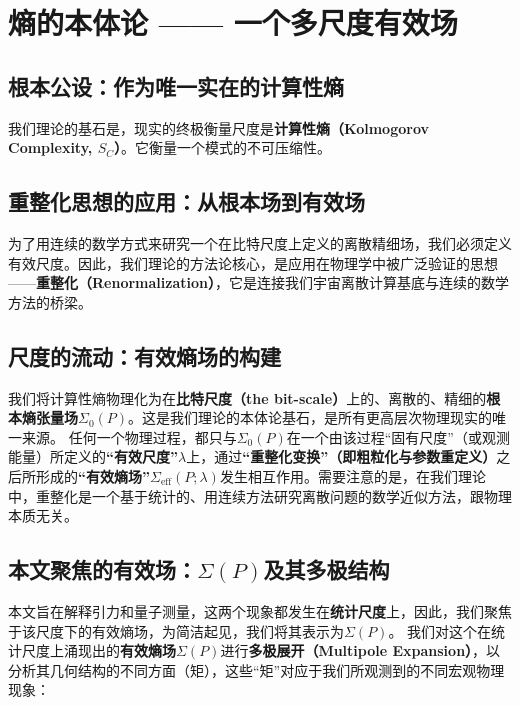 \documentclass[12pt]{article}
\begin{document}
\section{熵的本体论 —— 一个多尺度有效场}

\subsection{根本公设：作为唯一实在的计算性熵}
我们理论的基石是，现实的终极衡量尺度是\textbf{计算性熵（Kolmogorov Complexity, $S_C$）}。它衡量一个模式的不可压缩性。

\subsection{重整化思想的应用：从根本场到有效场}
为了用连续的数学方式来研究一个在比特尺度上定义的离散精细场，我们必须定义有效尺度。因此，我们理论的方法论核心，是应用在物理学中被广泛验证的思想——\textbf{重整化（Renormalization）}，它是连接我们宇宙离散计算基底与连续的数学方法的桥梁。

\subsection{尺度的流动：有效熵场的构建}
我们将计算性熵物理化为在\textbf{比特尺度（the bit-scale）}上的、离散的、精细的\textbf{根本熵张量场$\Sigma_0(P)$}。这是我们理论的本体论基石，是所有更高层次物理现实的唯一来源。
任何一个物理过程，都只与$\Sigma_0(P)$在一个由该过程``固有尺度''（或观测能量）所定义的\textbf{``有效尺度''$\lambda$}上，通过\textbf{``重整化变换''（即粗粒化与参数重定义）}之后所形成的\textbf{``有效熵场''$\Sigma_{\text{eff}}(P; \lambda)$}发生相互作用。需要注意的是，在我们理论中，重整化是一个基于统计的、用连续方法研究离散问题的数学近似方法，跟物理本质无关。

\subsection{本文聚焦的有效场：$\Sigma(P)$及其多极结构}
本文旨在解释引力和量子测量，这两个现象都发生在\textbf{统计尺度}上，因此，我们聚焦于该尺度下的有效熵场，为简洁起见，我们将其表示为$\Sigma(P)$。
我们对这个在统计尺度上涌现出的\textbf{有效熵场$\Sigma(P)$}进行\textbf{多极展开（Multipole Expansion）}，以分析其几何结构的不同方面（矩），这些``矩''对应于我们所观测到的不同宏观物理现象：
\end{document}
